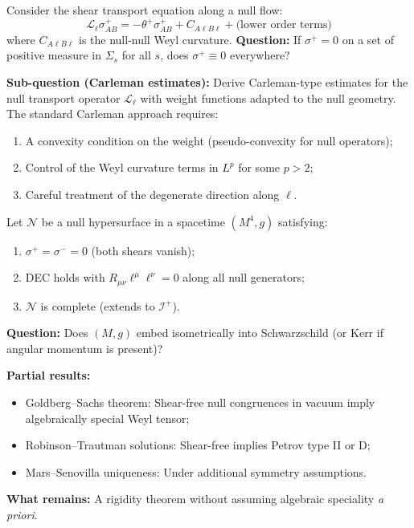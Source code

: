 \begin{openproblem}
\label{op:unique-continuation}
Consider the shear transport equation along a null flow:
\begin{equation}
\mathcal{L}_\ell \sigma^+_{AB} = -\theta^+ \sigma^+_{AB} + C_{A\ell B\ell} + \text{(lower order terms)}
\end{equation}
where $C_{A\ell B\ell}$ is the null-null Weyl curvature.
\textbf{Question:} If $\sigma^+ = 0$ on a set of positive measure in $\Sigma_s$ for all $s$, does $\sigma^+ \equiv 0$ everywhere?

\textbf{Sub-question (Carleman estimates):} Derive Carleman-type estimates for the null transport operator $\mathcal{L}_\ell$ with weight functions adapted to the null geometry. The standard Carleman approach requires:
\begin{enumerate}[label=(\roman*)]
\item A convexity condition on the weight (pseudo-convexity for null operators);
\item Control of the Weyl curvature terms in $L^p$ for some $p > 2$;
\item Careful treatment of the degenerate direction along $\ell$.
\end{enumerate}
\end{openproblem}

\begin{openproblem}
\label{op:shear-free-rigidity}
Let $\mathcal{N}$ be a null hypersurface in a spacetime $(M^4, g)$ satisfying:
\begin{enumerate}[label=(\roman*)]
\item $\sigma^+ = \sigma^- = 0$ (both shears vanish);
\item DEC holds with $R_{\mu\nu}\ell^\mu\ell^\nu = 0$ along all null generators;
\item $\mathcal{N}$ is complete (extends to $\mathscr{I}^+$).
\end{enumerate}
\textbf{Question:} Does $(M, g)$ embed isometrically into Schwarzschild (or Kerr if angular momentum is present)?

\textbf{Partial results:}
\begin{itemize}
\item Goldberg--Sachs theorem: Shear-free null congruences in vacuum imply algebraically special Weyl tensor;
\item Robinson--Trautman solutions: Shear-free implies Petrov type II or D;
\item Mars--Senovilla uniqueness: Under additional symmetry assumptions.
\end{itemize}
\textbf{What remains:} A rigidity theorem without assuming algebraic speciality \emph{a priori}.
\end{openproblem}

